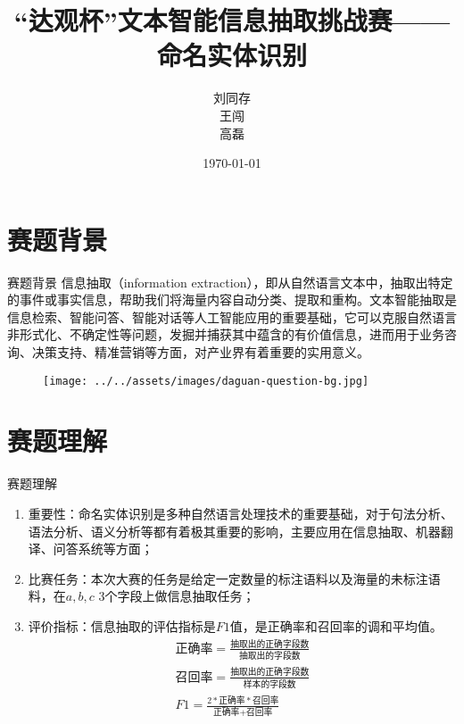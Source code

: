 \documentclass[9pt,aspectratio=169]{ctexbeamer}
\title{“达观杯”文本智能信息抽取挑战赛——命名实体识别}
\author{刘同存\\王闯\\高磊}
\date{\today}
\begin{document}
	
	\begin{frame}
		\titlepage
	\end{frame}
	\section{赛题背景}
	\begin{frame}{赛题背景}
		信息抽取（information extraction），即从自然语言文本中，抽取出特定的事件或事实信息，帮助我们将海量内容自动分类、提取和重构。文本智能抽取是信息检索、智能问答、智能对话等人工智能应用的重要基础，它可以克服自然语言非形式化、不确定性等问题，发掘并捕获其中蕴含的有价值信息，进而用于业务咨询、决策支持、精准营销等方面，对产业界有着重要的实用意义。
		
		\begin{figure}
			\centering
			
			\texttt{[image: ../../assets/images/daguan-question-bg.jpg]}
		\end{figure}
	\end{frame}

	\section{赛题理解}
	\begin{frame}{赛题理解}
		
		\begin{enumerate}
			\item 重要性：命名实体识别是多种自然语言处理技术的重要基础，对于句法分析、语法分析、语义分析等都有着极其重要的影响，主要应用在信息抽取、机器翻译、问答系统等方面；
			\item 比赛任务：本次大赛的任务是给定一定数量的标注语料以及海量的未标注语料，在$a,b,c$ 3个字段上做信息抽取任务；
			\item 评价指标：信息抽取的评估指标是$F1$值，是正确率和召回率的调和平均值。\begin{gather*}
			\text{正确率} = \frac{\text{抽取出的正确字段数}}{\text{抽取出的字段数}} \\
			\text{召回率} = \frac{\text{抽取出的正确字段数}}{\text{样本的字段数}}\\
			F1 = \frac{2 * \text{正确率}*\text{召回率}}{\text{正确率}+\text{召回率}}
			\end{gather*}
		\end{enumerate}
		
	\end{frame}
\end{document}
